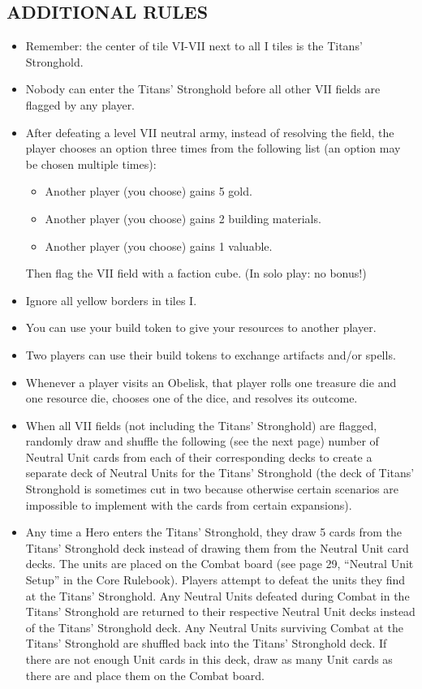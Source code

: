 \subsection*{\MakeUppercase{Additional Rules}}
\begin{itemize}
    \item Remember: the center of tile VI-VII next to all I tiles is the Titans' Stronghold.
    \item Nobody can enter the Titans' Stronghold before all other VII fields are flagged by any player.
    \item After defeating a level VII neutral army, instead of resolving the field, the player chooses an option three times from the following list (an option may be chosen multiple times):
    \begin{itemize}
        \item Another player (you choose) gains 5 gold.
        \item Another player (you choose) gains 2 building materials.
        \item Another player (you choose) gains 1 valuable.
    \end{itemize}
    Then flag the VII field with a faction cube.
    (In solo play: no bonus!)
    \item Ignore all yellow borders in tiles I.
    \item You can use your build token to give your resources to another player.
    \item Two players can use their build tokens to exchange artifacts and/or spells.
    \item Whenever a player visits an Obelisk, that player rolls one treasure die and one resource die, chooses one of the dice, and resolves its outcome.
    \item When all VII fields (not including the Titans' Stronghold) are flagged, randomly draw and shuffle the following (see the next page) number of Neutral Unit cards from each of their corresponding decks to create a separate deck of Neutral Units for the Titans' Stronghold (the deck of Titans' Stronghold is sometimes cut in two because otherwise certain scenarios are impossible to implement with the cards from certain expansions).
    \item Any time a Hero enters the Titans' Stronghold, they draw 5 cards from the Titans' Stronghold deck instead of drawing them from the Neutral Unit card decks. The units are placed on the Combat board (see page 29, “Neutral Unit Setup” in the Core Rulebook). Players attempt to defeat the units they find at the Titans' Stronghold. Any Neutral Units defeated during Combat in the Titans' Stronghold are returned to their respective Neutral Unit decks instead of the Titans' Stronghold deck. Any Neutral Units surviving Combat at the Titans' Stronghold are shuffled back into the Titans' Stronghold deck. If there are not enough Unit cards in this deck, draw as many Unit cards as there are and place them on the Combat board.

\end{itemize}
